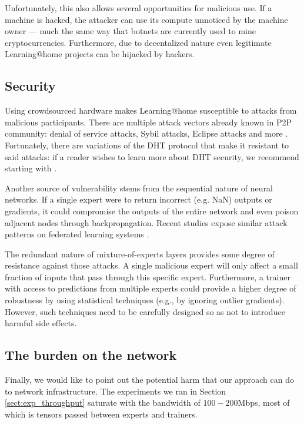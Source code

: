Unfortunately, this also allows several opportunities for malicious use. If a machine is hacked, the attacker can use its compute unnoticed by the machine owner --- much the same way that botnets are currently used to mine cryptocurrencies. Furthermore, due to decentalized nature even legitimate Learning@home projects can be hijacked by hackers.

\vspace{-6px}
\subsection*{Security} 
\vspace{-6px}
Using crowdsourced hardware makes Learning@home susceptible to attacks from malicious participants. There are multiple attack vectors already known in P2P community: denial of service attacks, Sybil attacks, Eclipse attacks and more \cite{urdaneta2011survey, sybil_attacks_dht, dos_resistance, sybil_nodes}. Fortunately, there are variations of the DHT protocol that make it resistant to said attacks: if a reader wishes to learn more about DHT security, we recommend starting with \cite{urdaneta2011survey}.

Another source of vulnerability stems from the sequential nature of neural networks. If a single expert were to return incorrect (e.g. NaN) outputs or gradients, it could compromise the outputs of the entire network and even poison adjacent nodes through backpropagation. Recent studies expose similar attack patterns on federated learning systems \cite{bagdasaryan2018backdoor, bhagoji2018analyzing}.

The redundant nature of mixture-of-experts layers provides some degree of resistance against those attacks. A single malicious expert will only affect a small fraction of inputs that pass through this specific expert. Furthermore, a trainer with access to predictions from multiple experts could provide a higher degree of robustness by using statistical techniques (e.g., by ignoring outlier gradients). However, such techniques need to be carefully designed so as not to introduce harmful side effects.

\vspace{-6px}
\subsection*{The burden on the network} 
\vspace{-6px}
Finally, we would like to point out the potential harm that our approach can do to network infrastructure. The experiments we ran in Section \ref{sect:exp_throughput} saturate with the bandwidth of $100-200$Mbps, most of which is tensors passed between experts and trainers. 

